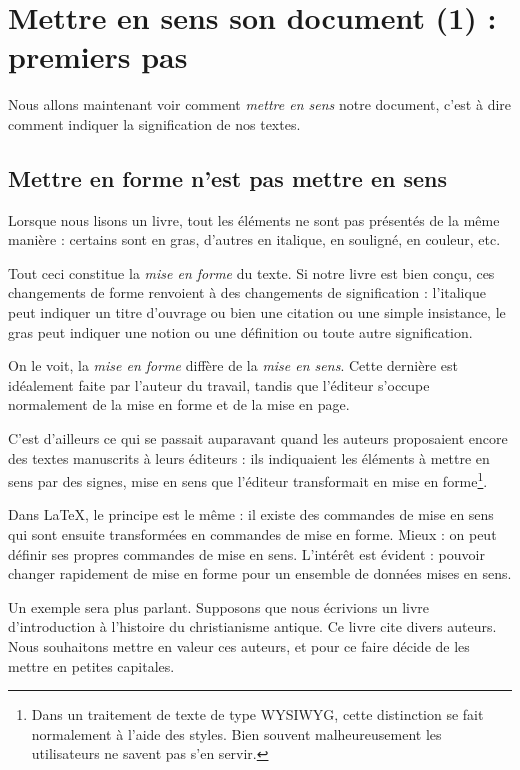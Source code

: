 \chapter{Mettre en sens son document (1) : premiers pas}

\begin{intro}
Nous allons maintenant voir comment \emph{mettre en sens} notre document, c'est à dire comment indiquer  la signification de nos textes.
\end{intro}

\section{Mettre en forme n'est pas mettre en sens}\label{sensforme}

Lorsque nous lisons un livre, tout les éléments ne sont pas présentés de la même manière : certains sont en gras, d'autres en italique, en souligné, en couleur, etc. 

Tout ceci constitue la \emph{mise en forme} du texte. Si notre livre est bien conçu, ces changements de forme renvoient à des changements de signification : l'italique peut indiquer un titre d'ouvrage ou bien une citation ou une simple insistance, le gras peut indiquer une notion ou une définition ou toute autre signification.

On le voit, la \emph{mise en forme} diffère de la \emph{mise en sens}. Cette dernière est idéalement faite par l'auteur du travail, tandis que l'éditeur s'occupe normalement de la mise en forme et de la mise en page.

C'est d'ailleurs ce qui se passait auparavant quand les auteurs proposaient encore des textes manuscrits à leurs éditeurs : ils indiquaient les éléments à mettre en sens par des signes, mise en sens que l'éditeur transformait en mise en forme\footnote{Dans un traitement de texte de type WYSIWYG, cette distinction se fait normalement à l'aide des styles. Bien souvent malheureusement les utilisateurs ne savent pas s'en servir.}.

Dans \LaTeX, le principe est le même : il existe des commandes de mise en sens qui sont ensuite transformées en commandes de mise en forme. Mieux : on peut définir ses propres commandes de mise en sens. L'intérêt est  évident : pouvoir changer rapidement de mise en forme pour un ensemble de données mises en sens.

Un exemple sera plus parlant. Supposons que nous écrivions un livre d'introduction à l'histoire du christianisme antique. Ce livre cite divers auteurs. Nous souhaitons mettre en valeur ces auteurs, et pour ce faire décide de les mettre en petites capitales.

